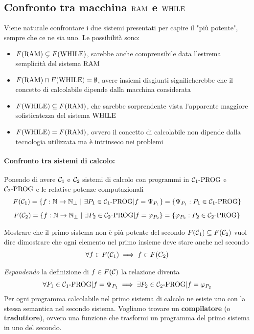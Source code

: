 \subsection{Confronto tra macchina $\text{RAM}$ e $\text{WHILE}$}
Viene naturale confrontare i due sistemi presentati per capire il "più potente", sempre che ce ne sia uno. Le possibilità sono: 
\begin{itemize}
	\item $F(\text{RAM}) \subsetneq F(\text{WHILE})$, sarebbe anche comprensibile data l'estrema semplicità del sistema $\text{RAM}$
	\item $F(\text{RAM}) \cap F(\text{WHILE}) = \emptyset$, avere insiemi disgiunti significherebbe che il concetto di calcolabile dipende dalla macchina considerata
	\item $F(\text{WHILE}) \subseteq F(\text{RAM})$, che sarebbe sorprendente vista l'apparente maggiore sofisticatezza del sistema $\text{WHILE}$
	\item $F(\text{WHILE}) = F(\text{RAM})$, ovvero il concetto di calcolabile non dipende dalla tecnologia utilizzata ma è intrinseco nei problemi
\end{itemize}

\paragraph{Confronto tra sistemi di calcolo:} Ponendo di avere $\mathcal{C}_1$ e $\mathcal{C}_2$ sistemi di calcolo con programmi in $\mathcal{C}_{1}\text{-}\text{PROG}$ e $\mathcal{C}_{2}\text{-}\text{PROG}$ e le relative potenze computazionali
$$ F(\mathcal{C}_1) = \left\{f: \mathbb{N} \rightarrow \mathbb{N}_\bot \ | \ \exists P_1 \in \mathcal{C}_{1}\text{-}\text{PROG} | f = \Psi_{P_1} \right\} = \left\{\Psi_{P_1}: P_1 \in \mathcal{C}_{1}\text{-}\text{PROG} \right\} $$
$$ F(\mathcal{C}_2) = \left\{f: \mathbb{N} \rightarrow \mathbb{N}_\bot \ | \ \exists P_2 \in \mathcal{C}_{2}\text{-}\text{PROG} | f = \varphi_{P_2} \right\} = \left\{\varphi_{P_2}: P_2 \in \mathcal{C}_{2}\text{-}\text{PROG} \right\} $$

Mostrare che il primo sistema non è più potente del secondo $F(\mathcal{C}_1) \subseteq F(\mathcal{C}_2)$ vuol dire dimostrare che ogni elemento nel primo insieme deve stare anche nel secondo
$$ \forall f \in F(\mathcal{C}_1) \implies f \in F(C_2) $$

\textit{Espandendo} la definizione di $f \in F(\mathcal{C})$ la relazione diventa
$$ \forall P_1 \in \mathcal{C}_{1}\text{-}\text{PROG} | f = \Psi_{P_1} \implies \exists P_2 \in \mathcal{C}_{2}\text{-}\text{PROG} | f = \varphi_{P_2} $$
Per ogni programma calcolabile nel primo sistema di calcolo ne esiste uno con la stessa semantica nel secondo sistema. Vogliamo trovare un \textbf{compilatore} (o \textbf{traduttore}), ovvero una funzione che trasformi un programma del primo sistema in uno del secondo.

